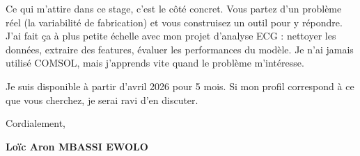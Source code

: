 \documentclass[a4paper,11pt]{article}
\begin{document}
Ce qui m'attire dans ce stage, c'est le côté concret. Vous partez d'un problème réel (la variabilité de fabrication) et vous construisez un outil pour y répondre. J'ai fait ça à plus petite échelle avec mon projet d'analyse ECG : nettoyer les données, extraire des features, évaluer les performances du modèle. Je n'ai jamais utilisé COMSOL, mais j'apprends vite quand le problème m'intéresse.

Je suis disponible à partir d'avril 2026 pour 5 mois. Si mon profil correspond à ce que vous cherchez, je serai ravi d'en discuter.

\vspace{0.6cm}

Cordialement,

\vspace{0.4cm}

\textbf{Loïc Aron MBASSI EWOLO}
\end{document}
